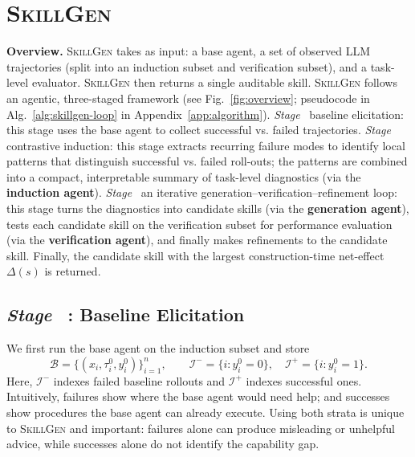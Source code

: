 \documentclass{article}
\newcommand*\circledblue[1]{\tikz[baseline=(char.base)]{
            \node[shape=circle,draw=NavyBlue!100,fill=NavyBlue!10,thick,inner sep=1pt] (char) {\scriptsize\textsf#1};}}
\begin{document}
\section{\textsc{SkillGen}}
\label{sec:method}



\textbf{Overview.} \textsc{SkillGen} takes as input: a base agent, a set of observed LLM trajectories (split into an induction subset and verification subset), and a task-level evaluator. \textsc{SkillGen} then returns a single auditable skill.
\textsc{SkillGen} follows an agentic, three-staged framework (see Fig.~\ref{fig:overview}; pseudocode in Alg.~\ref{alg:skillgen-loop} in Appendix~\ref{app:algorithm}).
\emph{Stage}~\circledblue{1} baseline elicitation: this stage uses the base agent to collect successful vs. failed trajectories.
\emph{Stage}~\circledblue{2} contrastive induction: this stage extracts recurring failure modes to identify local patterns that distinguish successful vs. failed roll-outs; the patterns are combined into a compact, interpretable summary of task-level diagnostics (via the \textbf{induction agent}).
\emph{Stage}~\circledblue{3} an iterative generation--verification--refinement loop: this stage turns the diagnostics into candidate skills  (via the \textbf{generation agent}), tests each candidate skill on the verification subset for performance evaluation (via the \textbf{verification agent}), and finally makes refinements to the candidate skill.
Finally, the candidate skill with the largest construction-time net-effect $\Delta(s)$ is returned.



\subsection{\emph{Stage}~\texorpdfstring{\protect\circledblue{1}} {(1)} : Baseline Elicitation}

We first run the base agent on the induction subset and store
\begin{equation}
    \mathcal{B}=\{(x_i,\tau^{0}_{i},y^{0}_{i})\}_{i=1}^{n},
    \qquad
    \mathcal{I}^{-}=\{i:y^{0}_{i}=0\},\quad
    \mathcal{I}^{+}=\{i:y^{0}_{i}=1\}.
\end{equation}
Here, $\mathcal{I}^{-}$ indexes failed baseline rollouts and $\mathcal{I}^{+}$ indexes successful ones.
Intuitively, failures show where the base agent would need help; and successes show procedures the base agent can already execute.
Using both strata is unique to \textsc{SkillGen} and important: failures alone can produce misleading or unhelpful advice, while successes alone do not identify the capability gap.
\end{document}
